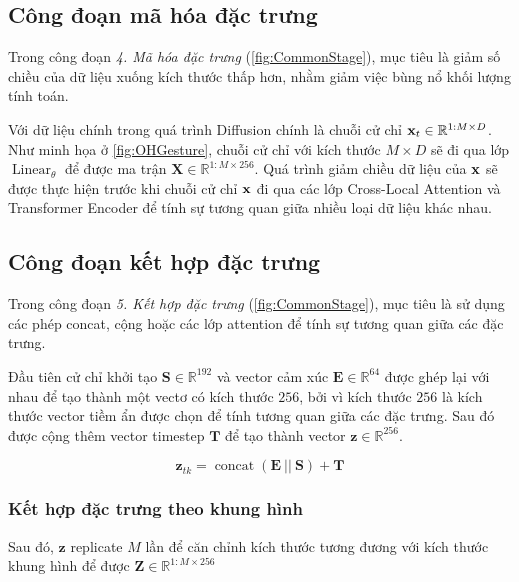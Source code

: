 \subsection{Công đoạn mã hóa đặc trưng}

Trong công đoạn \textit{4. Mã hóa đặc trưng} (\autoref{fig:CommonStage}), mục tiêu là giảm số chiều của dữ liệu xuống kích thước thấp hơn, nhằm giảm việc bùng nổ khối lượng tính toán.

Với dữ liệu chính trong quá trình Diffusion chính là chuỗi cử chỉ $\mathbf{x}_t \in \mathbb{R}^{1:M \times D}$. Như minh họa ở \autoref{fig:OHGesture}, chuỗi cử chỉ với kích thước $M \times D$ sẽ đi qua lớp $\operatorname{Linear}_{\theta}$ để được ma trận $\mathbf{X} \in \mathbb{R}^{1:M \times 256}$. Quá trình giảm chiều dữ liệu của $\mathbf{x}$ sẽ được thực hiện trước khi chuỗi cử chỉ $\mathbf{x}$ đi qua các lớp Cross-Local Attention và Transformer Encoder để tính sự tương quan giữa nhiều loại dữ liệu khác nhau.


\subsection{Công đoạn kết hợp đặc trưng}

Trong công đoạn \textit{5. Kết hợp đặc trưng} (\autoref{fig:CommonStage}), mục tiêu là sử dụng các phép concat, cộng hoặc các lớp attention để tính sự tương quan giữa các đặc trưng.

Đầu tiên cử chỉ khởi tạo $\mathbf{S} \in \mathbb{R}^{192}$ và vector cảm xúc $\mathbf{E} \in \mathbb{R}^{64}$ được ghép lại với nhau để tạo thành một vectơ có kích thước $256$, bởi vì kích thước $256$ là kích thước vector tiềm ẩn được chọn để tính tương quan giữa các đặc trưng. Sau đó được cộng thêm vector timestep $\mathbf{T}$ để tạo thành vector $\mathbf{z} \in \mathbb{R}^{256}$.

\begin{equation}
	\label{eq:ConditionConcat}
	\mathbf{z}_{tk} = \operatorname{concat }(\mathbf{E}\ || \  \mathbf{S}) + \mathbf{T}
\end{equation}

\subsubsection{Kết hợp đặc trưng theo khung hình}

Sau đó, $\mathbf{z}$  replicate $M$ lần để căn chỉnh kích thước tương đương với kích thước khung hình để được $\mathbf{Z} \in \mathbb{R}^{1:M \times 256}$

